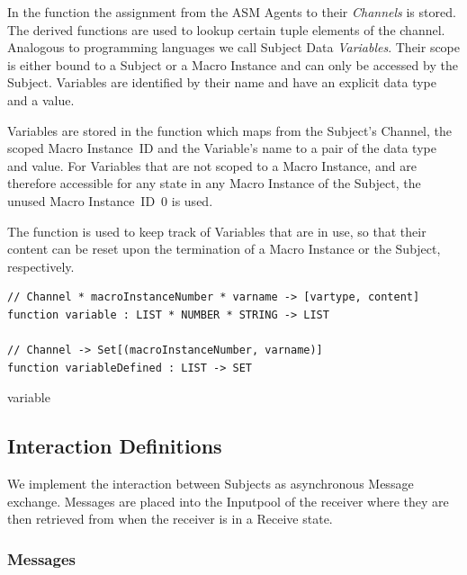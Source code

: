 In the function  the assignment from the ASM Agents to their \textit{Channels} is stored.
The derived functions are used to lookup certain tuple elements of the channel.\\



Analogous to programming languages we call Subject Data \textit{Variables}.
Their scope is either bound to a Subject or a Macro Instance and can only be
accessed by the Subject. Variables are identified by their name and have an
explicit data type and a value.

Variables are stored in the  function which maps from
the Subject's Channel, the scoped Macro Instance~ID and the Variable's name to
a pair of the data type and value. For Variables that are not scoped to a Macro
Instance, and are therefore accessible for any state in any Macro Instance of
the Subject, the unused Macro Instance~ID~0 is used.

The function  is used to keep track of Variables
that are in use, so that their content can be reset upon the termination of a
Macro Instance or the Subject, respectively.


\begin{listing}[htbp]
\begin{verbatim}
// Channel * macroInstanceNumber * varname -> [vartype, content]
function variable : LIST * NUMBER * STRING -> LIST

// Channel -> Set[(macroInstanceNumber, varname)]
function variableDefined : LIST -> SET
\end{verbatim}
\caption{variable}
\label{lst:shortasm:variable}
\end{listing}




\subsection{Interaction Definitions}\label{sec:InteractionDefinitions}

We implement the interaction between Subjects as asynchronous Message exchange.
Messages are placed into the Inputpool of the receiver where they are then retrieved from when the receiver is in a Receive state.


\subsubsection{Messages}\label{sec:messages}

